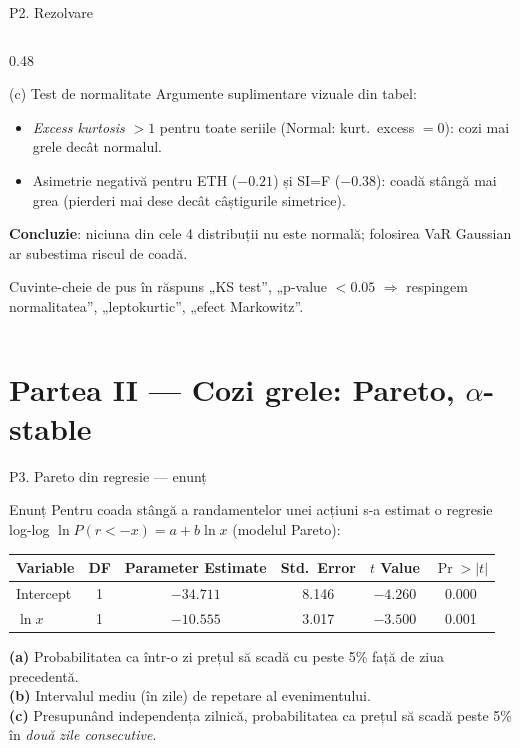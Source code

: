 \documentclass[9pt, aspectratio=169, t]{beamer}
\begin{document}
\begin{frame}[shrink=25]{P2. Rezolvare}
\begin{columns}[T]
\begin{column}{0.48\textwidth}
\begin{block}{(c) Test de normalitate}
Argumente suplimentare vizuale din tabel:
\begin{itemize}\setlength{\itemsep}{1pt}
\item \emph{Excess kurtosis} $>1$ pentru toate seriile (Normal: kurt.\ excess $=0$): cozi mai grele decât normalul.
\item Asimetrie negativă pentru ETH ($-0.21$) și SI=F ($-0.38$): coadă stângă mai grea (pierderi mai dese decât câștigurile simetrice).
\end{itemize}
\textbf{Concluzie}: niciuna din cele 4 distribuții nu este normală; folosirea VaR Gaussian ar subestima riscul de coadă.
\end{block}
\begin{exampleblock}{Cuvinte-cheie de pus în răspuns}
„KS test'', „p-value $<0.05$ $\Rightarrow$ respingem normalitatea'', „leptokurtic'', „efect Markowitz''.
\end{exampleblock}
\end{column}
\end{columns}
\end{frame}

\section{Partea II --- Cozi grele: Pareto, $\alpha$-stable}

\begin{frame}{P3. Pareto din regresie --- enunț}
\begin{block}{Enunț}
Pentru coada stângă a randamentelor unei acțiuni s-a estimat o regresie log-log $\ln P(r<-x) = a + b\ln x$ (modelul Pareto):
\begin{center}\small
\begin{tabular}{lccccc}\toprule
Variable & DF & Parameter Estimate & Std.\ Error & $t$ Value & $\Pr>|t|$\\\midrule
Intercept & 1 & $-34.711$ & 8.146 & $-4.260$ & 0.000\\
$\ln x$   & 1 & $-10.555$ & 3.017 & $-3.500$ & 0.001\\\bottomrule
\end{tabular}
\end{center}
\textbf{(a)} Probabilitatea ca într-o zi prețul să scadă cu peste 5\% față de ziua precedentă.\\
\textbf{(b)} Intervalul mediu (în zile) de repetare al evenimentului.\\
\textbf{(c)} Presupunând independența zilnică, probabilitatea ca prețul să scadă peste 5\% în \emph{două zile consecutive}.
\end{block}
\end{frame}
\end{document}
